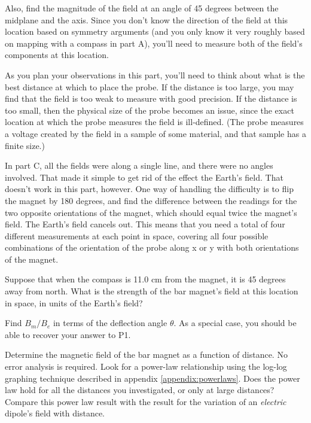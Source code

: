 Also, find the magnitude of the field at an angle of 45 degrees between the midplane
and the axis. Since you don't know the direction of the field at this location based on
symmetry arguments (and you only know it very roughly based on mapping with a compass in
part A), you'll need to measure both of the field's components at this location.

As you plan your observations in this part, you'll need to think about what is the
best distance at which to place the probe. If the distance is too large, you may find that
the field is too weak to measure with good precision. If the distance is too small, then the
physical size of the probe becomes an issue, since the exact location at which the probe
measures the field is ill-defined. (The probe measures a voltage created by the field in
a sample of some material, and that sample has a finite size.)

In part C, all the fields were along a single line, and there were no angles involved.
That made it simple to get rid of the effect the Earth's field. That doesn't work in this part,
however. One way of handling the difficulty is to flip the magnet by 180 degrees, and find
the difference between the readings for the two opposite orientations of the magnet, which should
equal twice the magnet's field. The Earth's field cancels out. This means that you need a total
of four different measurements at each point in space, covering all four possible combinations of
the orientation of the probe along x or y with both orientations of the magnet.

\prelab

\prelabquestion  Suppose that
when the compass is 11.0 cm from the magnet, it is
45 degrees away from north. What is
the strength of the bar magnet's field at this location in space,
in units of the Earth's field?

\prelabquestion Find $B_m/B_e$ in terms of the deflection angle $\theta$. As a special
case, you should be able to recover your answer to P1.

\analysis

Determine the magnetic
field of the bar magnet as a function of distance. No error analysis is required. 
Look for a power-law relationship using the log-log graphing technique described in 
appendix \ref{appendix:powerlaws}. Does the power law hold for
all the distances you investigated, or only at large distances?
Compare this power law result with the result
for the variation of an \emph{electric} dipole's field with
distance.
